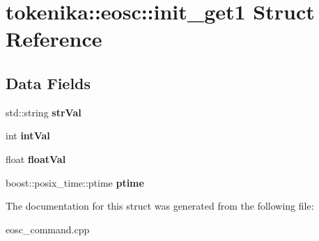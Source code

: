 \hypertarget{structtokenika_1_1eosc_1_1init__get1}{}\section{tokenika\+:\+:eosc\+:\+:init\+\_\+get1 Struct Reference}
\label{structtokenika_1_1eosc_1_1init__get1}
\subsection*{Data Fields}
\begin{DoxyCompactItemize}
\item 
\mbox{\label{structtokenika_1_1eosc_1_1init__get1_a16f6c66fce8c542e8523b10148ddc835}} 
std\+::string {\bfseries str\+Val}
\item 
\mbox{\label{structtokenika_1_1eosc_1_1init__get1_a3bbaa7577047893fea408af7bc26d3a6}} 
int {\bfseries int\+Val}
\item 
\mbox{\label{structtokenika_1_1eosc_1_1init__get1_a51a3770c50aebba378d7068951ecfe62}} 
float {\bfseries float\+Val}
\item 
\mbox{\label{structtokenika_1_1eosc_1_1init__get1_a0f3e1707874a60d3b60bfc8809d5fe6f}} 
boost\+::posix\+\_\+time\+::ptime {\bfseries ptime}
\end{DoxyCompactItemize}


The documentation for this struct was generated from the following file\+:\begin{DoxyCompactItemize}
\item 
eosc\+\_\+command.\+cpp\end{DoxyCompactItemize}
